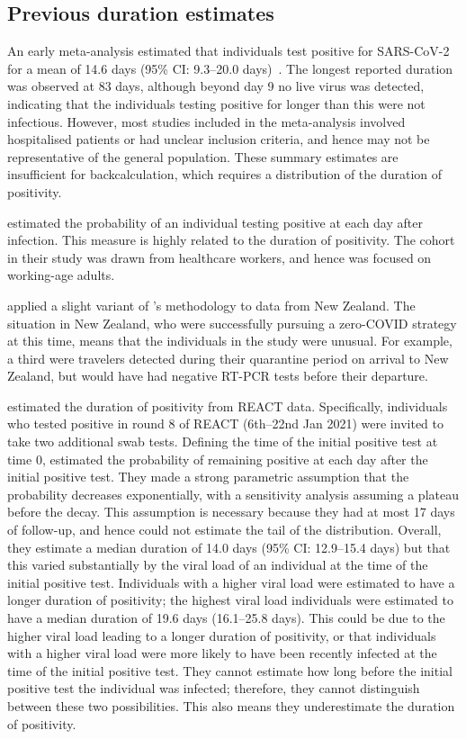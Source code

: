 \documentclass[thesis.tex]{subfiles}
\begin{document}
\subsection{Previous duration estimates} \label{intro:sec:previous-duration-estimates}

An early meta-analysis estimated that individuals test positive for SARS-CoV-2 for a mean of 14.6 days (95\% CI: 9.3--20.0 days)~\autocite{cevikShedding}.
The longest reported duration was observed at 83 days, although beyond day 9 no live virus was detected, indicating that the individuals testing positive for longer than this were not infectious.
However, most studies included in the meta-analysis involved hospitalised patients or had unclear inclusion criteria, and hence may not be representative of the general population.
These summary estimates are insufficient for backcalculation, which requires a distribution of the duration of positivity.

\Textcite{hellewellPCRSensitivity} estimated the probability of an individual testing positive at each day after infection.
This measure is highly related to the duration of positivity.
The cohort in their study was drawn from healthcare workers, and hence was focused on working-age adults.

\Textcite{binnySensitivity} applied a slight variant of \textcite{hellewellPCRSensitivity}'s methodology to data from New Zealand.
The situation in New Zealand, who were successfully pursuing a zero-COVID strategy at this time, means that the individuals in the study were unusual.
For example, a third were travelers detected during their quarantine period on arrival to New Zealand, but would have had negative RT-PCR tests before their departure.

\Textcite{ealesCharacterising} estimated the duration of positivity from REACT data.
Specifically, individuals who tested positive in round 8 of REACT (6th--22nd Jan 2021) were invited to take two additional swab tests.
Defining the time of the initial positive test at time 0, \textcite{ealesCharacterising} estimated the probability of remaining positive at each day after the initial positive test.
They made a strong parametric assumption that the probability decreases exponentially, with a sensitivity analysis assuming a plateau before the decay.
This assumption is necessary because they had at most 17 days of follow-up, and hence could not estimate the tail of the distribution.
Overall, they estimate a median duration of 14.0 days (95\% CI: 12.9--15.4 days) but that this varied substantially by the viral load of an individual at the time of the initial positive test.
Individuals with a higher viral load were estimated to have a longer duration of positivity; the highest viral load individuals were estimated to have a median duration of 19.6 days (16.1--25.8 days).
This could be due to the higher viral load leading to a longer duration of positivity, or that individuals with a higher viral load were more likely to have been recently infected at the time of the initial positive test.
They cannot estimate how long before the initial positive test the individual was infected; therefore, they cannot distinguish between these two possibilities.
This also means they underestimate the duration of positivity.
\end{document}
